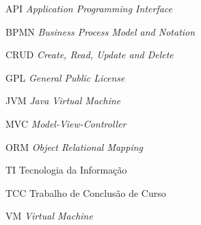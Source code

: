\begin{siglas}
  \item[API] \textit{Application Programming Interface}
  \item[BPMN] \textit{Business Process Model and Notation}
  \item[CRUD] \textit{Create, Read, Update and Delete} 
  \item[GPL] \textit{General Public License} 
  \item[JVM] \textit{Java Virtual Machine}
  \item[MVC] \textit{Model-View-Controller}
  \item[ORM] \textit{Object Relational Mapping}
  \item[TI]  Tecnologia da Informação
  \item[TCC] Trabalho de Conclusão de Curso
  \item[VM]  \textit{Virtual Machine}
\end{siglas}
